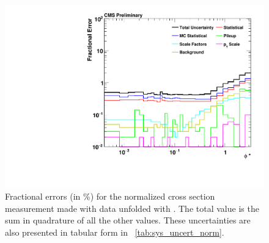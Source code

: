 \begin{figure}[!p]
    \centering
    \includegraphics[width=\textwidth]{figures/data_uncertainty_normalized.pdf}
    \caption[
        Fractional errors (in \%) for the normalized cross section measurement
        made with data unfolded with \MADGRAPH.
    ]{
        Fractional errors (in \%) for the normalized cross section measurement
        made with data unfolded with \MADGRAPH. The total value is the sum in
        quadrature of all the other values. These uncertainties are also
        presented in tabular form in \TAB~\ref{tab:sys_uncert_norm}.
    }
    \label{fig:sys_uncert_norm}
\end{figure}
